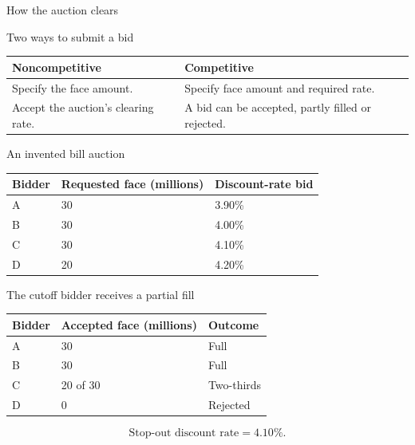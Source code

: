 \documentclass[12pt,aspectratio=169]{beamer}
\begin{document}

\begin{frame}{How the auction clears}
\end{frame}


\begin{frame}{Two ways to submit a bid}
\begin{center}\begin{tabular}{@{}>{\raggedright\arraybackslash}p{}>{\raggedright\arraybackslash}p{}@{}}\toprule \textbf{Noncompetitive} & \textbf{Competitive}\\\midrule Specify the face amount. & Specify face amount and required rate.\\[2mm]
Accept the auction’s clearing rate. & A bid can be accepted, partly filled or rejected.\\\bottomrule\end{tabular}\end{center}
\end{frame}


\begin{frame}{An invented bill auction}
\begin{center}\begin{tabular}{@{}lll@{}}\toprule \textbf{Bidder} & \textbf{Requested face (millions)} & \textbf{Discount-rate bid}\\\midrule A & 30 & 3.90\%\\[2mm]
B & 30 & 4.00\%\\[2mm]
C & 30 & 4.10\%\\[2mm]
D & 20 & 4.20\%\\\bottomrule\end{tabular}\end{center}
\end{frame}


\begin{frame}{The cutoff bidder receives a partial fill}
\begin{center}\begin{tabular}{@{}lll@{}}\toprule \textbf{Bidder} & \textbf{Accepted face (millions)} & \textbf{Outcome}\\\midrule A & 30 & Full\\[2mm]
B & 30 & Full\\[2mm]
C & 20 of 30 & Two-thirds\\[2mm]
D & 0 & Rejected\\\bottomrule\end{tabular}\end{center}\[\text{Stop-out discount rate}=4.10\%.\]
\end{frame}
\end{document}
